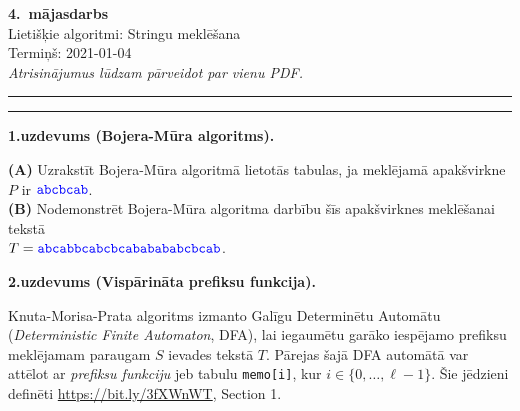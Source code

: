 \documentclass[a4paper,12pt]{article}
\begin{document}
\begin{center}
{\bf\Huge 4.\ mājasdarbs} \\[5pt]
Lietišķie algoritmi: Stringu meklēšana \\
Termiņš: 2021-01-04\\[5pt]
{\em Atrisinājumus lūdzam pārveidot par vienu PDF.}
\end{center}

\hrule
\vspace{2pt}
\hrule
\vspace{12pt}






\vspace{10pt}
{\bf 1.uzdevums (Bojera-Mūra algoritms).}

{\bf (A)} Uzrakstīt Bojera-Mūra algoritmā lietotās ta\-bu\-las, ja meklējamā 
apakšvirkne $P$ ir $\textcolor{blue}{\mathtt{abcbcab}}$.\\
{\bf (B)} Nodemonstrēt Bojera-Mūra algoritma darbību šīs apakšvirknes 
meklēšanai tekstā\\ $T = \textcolor{blue}{\mathtt{abcabbcabcbcababababcbcab}}$.



\vspace{10pt}
{\bf 2.uzdevums (Vispārināta prefiksu funkcija).}

Knuta-Morisa-Prata algoritms izmanto Ga\-lī\-gu De\-ter\-mi\-nē\-tu Automātu ({\em Deterministic Finite Automaton}, DFA), 
lai iegaumētu garāko iespējamo prefiksu meklējamam paraugam $S$ ievades tekstā $T$. 
Pārejas šajā DFA automātā var attēlot ar {\em prefiksu funkciju} jeb tabulu {\tt memo[i]}, 
kur $i \in \{ 0,\ldots,\ell{}-1 \}$. Šie jēdzieni definēti \url{https://bit.ly/3fXWnWT}, Section 1. 
\end{document}
